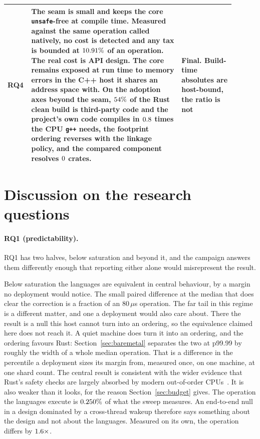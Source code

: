 \documentclass[english,oneside,a4paper,censored,csm,software-track-2020]{HYthesisML}
\begin{document}
\begin{table}[tp]
\begin{tabular}{@{}p{0.06\linewidth} p{0.62\linewidth} p{0.22\linewidth}@{}}
RQ4 & The seam is small and keeps the core \texttt{unsafe}-free at compile time. Measured against
the same operation called natively, no cost is detected and any tax is bounded at
$10.91\%$ of an operation. The real cost is API design. The core remains exposed at run
time to memory errors in the C++ host it shares an address space with. On the adoption axes beyond
the seam, $54\%$ of the Rust clean build is third-party code and the project's own
code compiles in $0.8$ times the CPU \texttt{g++} needs, the footprint
ordering reverses with the linkage policy, and the compared component resolves $0$ crates.
& Final. Build-time absolutes are host-bound, the ratio is not \\
\hline
\end{tabular}
\end{table}

\section{Discussion on the research questions}\label{sec:rqdiscussion}
\paragraph{RQ1 (predictability).} RQ1 has two halves, below saturation and beyond it, and the
campaign answers them differently enough that reporting either alone would misrepresent the
result.

Below saturation the languages are equivalent in central behaviour, by a margin no deployment
would notice. The small paired difference at the median that does clear the correction is a
fraction of an $80\,\mu$s operation. The far tail in this regime is a different matter, and one a
deployment would also care about. There the result is a null this host cannot turn into an
ordering, so the equivalence claimed here does not reach it. A quiet machine does turn it into an
ordering, and the ordering favours Rust: Section~\ref{sec:baremetal} separates the two at p99.99
by roughly the width of a whole median operation. That is a difference in the percentile a
deployment sizes its margin from, measured once, on one machine, at one shard count. The central result is consistent with
the wider evidence that
Rust's safety checks are largely absorbed by modern out-of-order
CPUs~\cite{balasubramanian2017rust,emmerich2019drivers}. It is also weaker than it
looks, for the reason Section~\ref{sec:budget} gives. The operation the
languages execute is $0.250\%$ of what the sweep measures. An end-to-end null in
a design dominated by a cross-thread wakeup therefore says something about the design and not
about the languages. Measured on its own, the operation differs by $1.6\times$.
\end{document}
